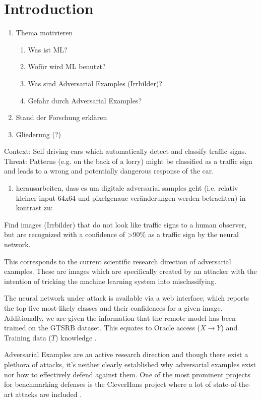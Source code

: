 \section{Introduction}

\begin{enumerate}
\item Thema motivieren
\begin{enumerate}
\item Was ist ML?
\item Wofür wird ML benutzt?
\item Was sind Adversarial Examples (Irrbilder)?
\item Gefahr durch Adversarial Examples?
\end{enumerate}
\item Stand der Forschung erklären
\item Gliederung (?)
\end{enumerate}


Context: Self driving cars which automatically detect and classify traffic signs.
Threat: Patterns (e.g. on the back of a lorry) might be classified as a traffic sign and leads to a wrong and potentially dangerous response of the car.

\begin{enumerate}
\item herausarbeiten, dass es um digitale adversarial samples geht
(i.e. relativ kleiner input 64x64 und pixelgenaue veränderungen werden betrachten)
in kontrast zu: \cite{eykholt2018robust}
\end{enumerate}

Find images (Irrbilder) that do not look like traffic signs to a human observer,
but are recognized with a confidence of >90\% as a traffic sign by the neural network.

This corresponds to the current scientific research direction of adversarial examples.
These are images which are specifically created by an attacker with the intention of tricking the machine learning system into misclassifying.

The neural network under attack is available via a web interface,
which reports the top five most-likely classes and their confidences for a given image.
Additionally, we are given the information that the remote model has been trained on the GTSRB dataset.
This equates to Oracle access ($X \rightarrow Y$) and Training data ($T$) knowledge \cite{papernot2016limitations}.

Adversarial Examples are an active research direction and though there exist a plethora of attacks,
it's neither clearly established why adversarial examples exist nor how to effectively defend against them.
One of the most prominent projects for benchmarking defenses is the CleverHans project where a lot of state-of-the-art attacks are included \cite{papernot2016cleverhans}.

